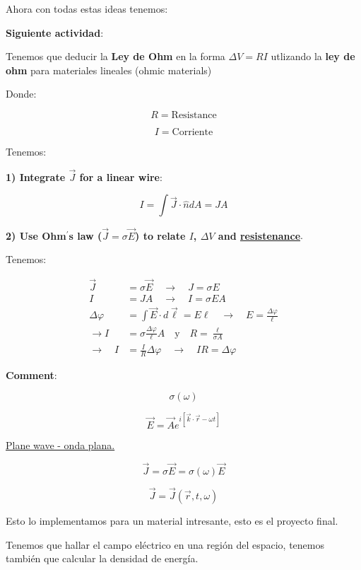 \documentclass{article}
\begin{document}
Ahora con todas estas ideas tenemos:


\textbf{Siguiente actividad}:


Tenemos que deducir la \textbf{Ley de Ohm} en la forma $\Delta{V} = RI$ utlizando la \textbf{ley de ohm} para materiales lineales (ohmic materials)

Donde:

\[R=\text{Resistance}\]

\[ I = \text{Corriente} \]



Tenemos:


\textbf{1) Integrate $\vec{J}$ for a linear wire}:


\[ I = \int\limits \vec{J} \cdot \hat{n} dA = JA  \]




\textbf{2) Use Ohm$^{\prime}$s law ($ \vec{J} = \sigma \vec{E} $) to relate $I$, $\Delta{V}$ and \underline{resistenance}}.



Tenemos:



\begin{equation}
\begin{split}
\vec{J}  &= \sigma \vec{E} \quad \to \quad J=\sigma E\\
I&=JA \quad \to \quad I=\sigma EA\\
\Delta{\varphi} &= \int\limits \vec{E} \cdot d\vec{\ell}= E\ell \quad \to \quad E = \frac{ \Delta{\varphi} }{\ell}\\
\to I &= \sigma \frac{\Delta{\varphi}}{\ell} A \quad \text{y} \quad R=\frac{\ell}{\sigma A}\\
\to \quad I&= \frac{I}{R}\Delta{\varphi} \quad \to \quad IR=\Delta{\varphi}
\end{split}
\end{equation}


\textbf{Comment}:

\[ \sigma(\omega) \]


\[ \vec{E} = \vec{A} e^{i \left[  \vec{k}\cdot \vec{r} - \omega{t}   \right]  } \]

\underline{Plane wave - onda plana.}

\[ \vec{J} = \sigma \vec{E} = \sigma (\omega) \vec{E}  \]

\[\vec{J} = \vec{J}( \vec{r},t,\omega )  \]



Esto lo implementamos para un material intresante, esto es el proyecto final. 

Tenemos que hallar el campo eléctrico en una región del espacio, tenemos también que calcular la densidad de energía.
\end{document}
